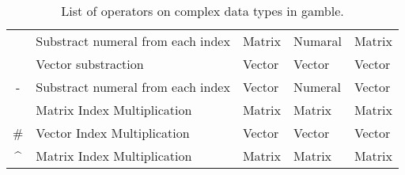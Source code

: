 \begin{table}[ht]
\begin{tabular}{|c|l|l|l|l|}
                    & Substract numeral from each index         & Matrix                           & Numaral                           & Matrix                          \\ \cline{2-5}
                    & \cellcolor{gray!40}Vector substraction    & \cellcolor{gray!40}Vector        & \cellcolor{gray!40}Vector         & \cellcolor{gray!40}Vector       \\ \cline{2-5} 
\multirow{-4}{*}{-} & Substract numeral from each index         & Vector                           & Numeral                           & Vector                          \\ \hline
                    & \cellcolor{gray!40}Matrix Index Multiplication & \cellcolor{gray!40}Matrix & \cellcolor{gray!40}Matrix & \cellcolor{gray!40}Matrix \\ \cline{2-5}
\multirow{-2}{*}{\#} & Vector Index Multiplication & Vector & Vector & Vector \\ \hline
\^{}                 & \cellcolor{gray!40}Matrix Index Multiplication & \cellcolor{gray!40}Matrix & \cellcolor{gray!40}Matrix & \cellcolor{gray!40}Matrix \\ \hline  

\end{tabular}
\caption{List of operators on complex data types in \gls{gamble}. }\label{tbl:matOps}
\end{table}